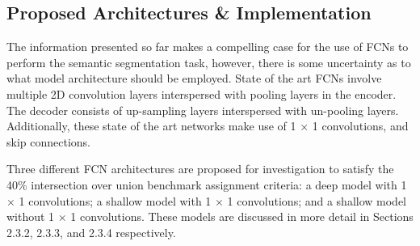 \documentclass[a4paper]{article}
\begin{document}



\subsection{Proposed Architectures \& Implementation}
The information presented so far makes a compelling case for the use of FCNs to perform the semantic segmentation task, however, there is some uncertainty as to what model architecture should be employed. State of the art FCNs involve multiple 2D convolution layers interspersed with pooling layers in the encoder. The decoder consists of up-sampling layers interspersed with un-pooling layers. Additionally, these state of the art networks make use of 1 $\times$ 1 convolutions, and skip connections.





Three different FCN architectures are proposed for investigation to satisfy the 40\% intersection over union benchmark assignment criteria: a deep model with 1 $\times$ 1 convolutions; a shallow model with 1 $\times$ 1 convolutions; and a shallow model without 1 $\times$ 1 convolutions. These models are discussed in more detail in Sections 2.3.2, 2.3.3, and 2.3.4 respectively.
\end{document}
